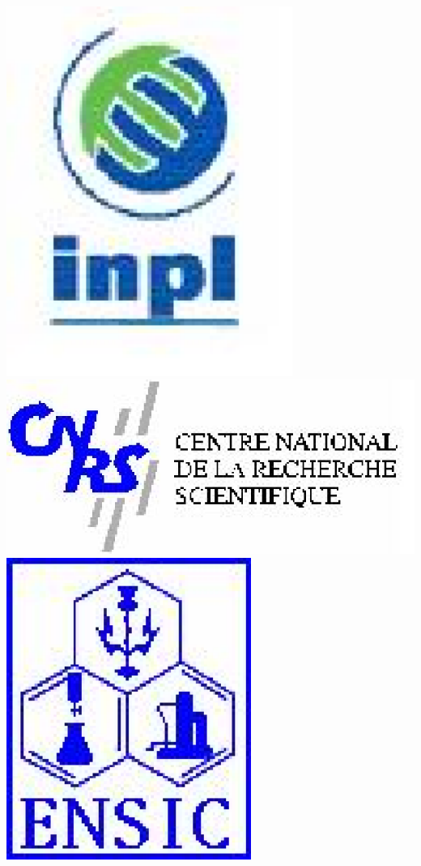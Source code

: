 \begin{minipage}[t]{1\linewidth}
  \begin{minipage}[t]{0.2\linewidth}
    \vspace{0.1cm}
    \begin{center}
      \includegraphics[width=0.7\textwidth]{pictures/logoinpl}
      \vspace{0.5cm}
      \includegraphics[width=1\textwidth]{pictures/logocnrs}
      \vspace{1cm}
      \includegraphics[width=0.6\textwidth]{pictures/logoensic2}

\end{center}
\end{minipage}
\end{minipage}

